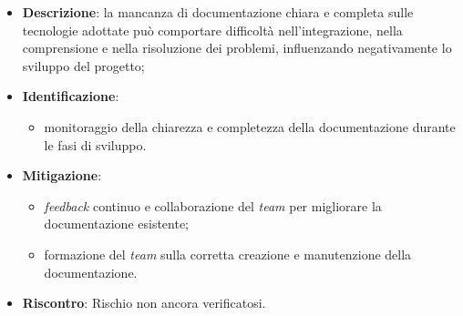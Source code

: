 \label{risk:scarsa documentazione delle tecnologie utilizzate}
\begin{itemize}
	\item \textbf{Descrizione}: la mancanza di documentazione chiara e completa sulle tecnologie adottate 
								può comportare difficoltà nell'integrazione, nella comprensione e nella 
								risoluzione dei problemi, influenzando negativamente lo sviluppo del progetto;
	\item \textbf{Identificazione}:
	      \begin{itemize}
				\item monitoraggio della chiarezza e completezza della documentazione durante le fasi di sviluppo.
	      \end{itemize}

	\item \textbf{Mitigazione}:
	      \begin{itemize}
		      \item \textit{feedback} continuo e collaborazione del \textit{team} per migliorare la documentazione esistente;
			  
			  \item formazione del \textit{team} sulla corretta creazione e manutenzione della documentazione.
	      \end{itemize}
	\item \textbf{Riscontro}: Rischio non ancora verificatosi.
\end{itemize}
